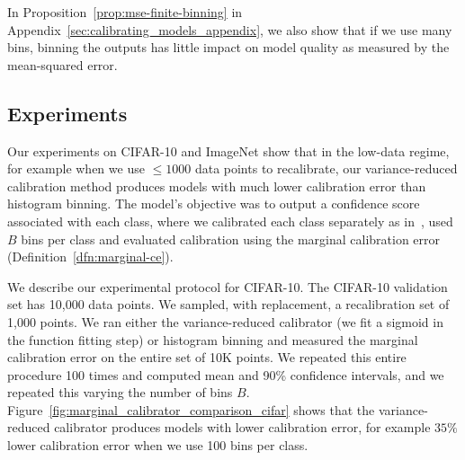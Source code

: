 In Proposition~\ref{prop:mse-finite-binning} in Appendix~\ref{sec:calibrating_models_appendix}, we also show that if we use many bins, binning the outputs has little impact on model quality as measured by the mean-squared error.

\subsection{Experiments}

Our experiments on CIFAR-10 and ImageNet show that in the low-data regime, for example when we use $\leq 1000$ data points to recalibrate, our variance-reduced calibration method produces models with much lower calibration error than histogram binning. The model's objective was to output a confidence score associated with each class, where we calibrated each class separately as in~\cite{zadrozny2002transforming}, used $B$ bins per class and evaluated calibration using the marginal calibration error (Definition~\ref{dfn:marginal-ce}).

We describe our experimental protocol for CIFAR-10.
The CIFAR-10 validation set has 10,000 data points. We sampled, with replacement, a recalibration set of 1,000 points. We ran either the variance-reduced calibrator (we fit a sigmoid in the function fitting step) or histogram binning and measured the marginal calibration error on the entire set of 10K points.
We repeated this entire procedure 100 times and computed mean and 90\% confidence intervals, and we repeated this varying the number of bins $B$. Figure~\ref{fig:marginal_calibrator_comparison_cifar} shows that the variance-reduced calibrator produces models with lower calibration error, for example $35\%$ lower calibration error when we use 100 bins per class.

